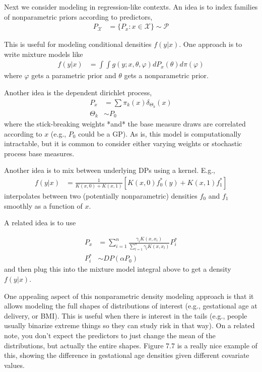 \documentclass{article}
\begin{document}
Next we consider modeling in regression-like contexts. An idea is to index
families of nonparametric priors according to predictors,
\begin{align}
P_{\mathcal{X}} &= \{P_{x} : x \in \mathcal{X}\} \sim \mathcal{P}
\end{align}

This is useful for modeling conditional densities $f\left(y \vert x\right)$.
One approach is to write mixture models like
\begin{align}
f\left(y \vert x\right) &= \int \int g\left(y; x, \theta, \varphi\right)dP_{x}\left(\theta\right) d\pi\left(\varphi\right)
\end{align}
where $\varphi$ gets a parametric prior and $\theta$ gets a nonparametric prior.

Another idea is the dependent dirichlet process,
\begin{align}
  P_{x} &= \sum \pi_{k}\left(x\right)\delta_{\Theta_{k}}\left(x\right) \\
  \Theta_{k} &\sim P_{0}
\end{align}
where the stick-breaking weights *and* the base measure draws are correlated
according to $x$ (e.g., $P_{0}$ could be a GP). As is, this model is
computationally intractable, but it is common to consider either varying weights
or stochastic process base measures.

Another idea is to mix between underlying DPs using a kernel. E.g.,
\begin{align}
f\left(y \vert x\right) &= \frac{1}{K\left(x, 0\right) + K\left(x, 1\right)}\left[K\left(x, 0\right)f_{0}^{\ast}\left(y\right) + K\left(x, 1\right)f_{1}^{\ast}\right]
\end{align}
interpolates between two (potentially nonparametric) densities $f_{0}$ and
$f_{1}$ smoothly as a function of $x$.

A related idea is to use

\begin{align}
  P_{x} &= \sum_{i = 1}^{n} \frac{\gamma_{i}K\left(x, x_{i}\right)}{\sum_{l = 1}^{n} \gamma_{l}K\left(x, x_{l}\right)} P_{i}^{\ast} \\
  P_{i}^{\ast} &\sim DP\left(\alpha P_{0}\right)
\end{align}
and then plug this into the mixture model integral above to get a density
$f\left(y \vert x\right)$.

One appealing aspect of this nonparametric density modeling approach is that it
allows modeling the full shapes of distributions of interest (e.g., gestational
age at delivery, or BMI). This is useful when there is interest in the tails
(e.g., people usually binarize extreme things so they can study risk in that
way). On a related note, you don't expect the predictors to just change the mean
of the distributions, but actually the entire shapes. Figure 7.7 is a really
nice example of this, showing the difference in gestational age densities given
different covariate values.
\end{document}
